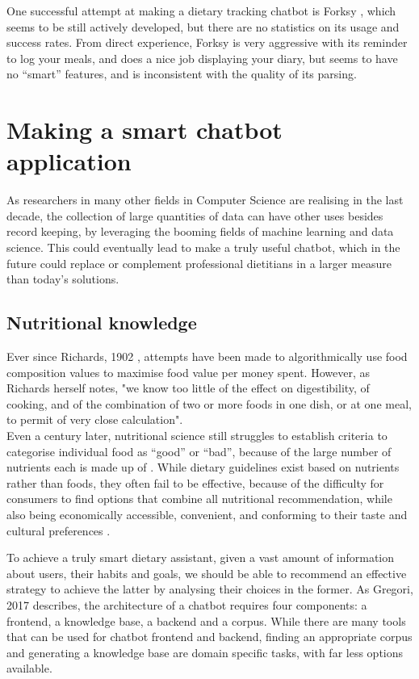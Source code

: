 One successful attempt at making a dietary tracking chatbot is Forksy \cite{forksywebsite}, which seems to be still actively developed, but there are no statistics on its usage and success rates. From direct experience, Forksy is very aggressive with its reminder to log your meals, and does a nice job displaying your diary, but seems to have no ``smart'' features, and is inconsistent with the quality of its parsing.
\section{Making a smart chatbot application}
As researchers in many other fields in Computer Science are realising in the last decade, the collection of large quantities of data can have other uses besides record keeping, by leveraging the booming fields of machine learning and data science. This could eventually lead to make a truly useful chatbot, which in the future could replace or complement professional dietitians in a larger measure than today's solutions. 
\subsection{Nutritional knowledge}
Ever since Richards, 1902 \cite{Richards1902a}, attempts have been made to algorithmically use food composition values to maximise food value per money spent. However, as Richards herself notes, "we know too little of the effect on digestibility, of cooking, and of the combination of two or more foods in one dish, or at one meal, to permit of very close calculation". \\
Even a century later, nutritional science still struggles to establish criteria to categorise individual food as ``good'' or ``bad'', because of the large number of nutrients each is made up of \cite{USDAFoodandNutritionService2007}. While dietary guidelines exist based on nutrients rather than foods, they often fail to be effective, because of the difficulty for consumers to find options that combine all nutritional recommendation, while also being economically accessible, convenient, and conforming to their taste and cultural preferences \cite{Green2015}. 

To achieve a truly smart dietary assistant, given a vast amount of information about users, their habits and goals, we should be able to recommend an effective strategy to achieve the latter by analysing their choices in the former. As Gregori, 2017 \cite{Gregori} describes, the architecture of a chatbot requires four components: a frontend, a knowledge base, a backend and a corpus. While there are many tools that can be used for chatbot frontend and backend, finding an appropriate corpus and generating a knowledge base are domain specific tasks, with far less options available. 

